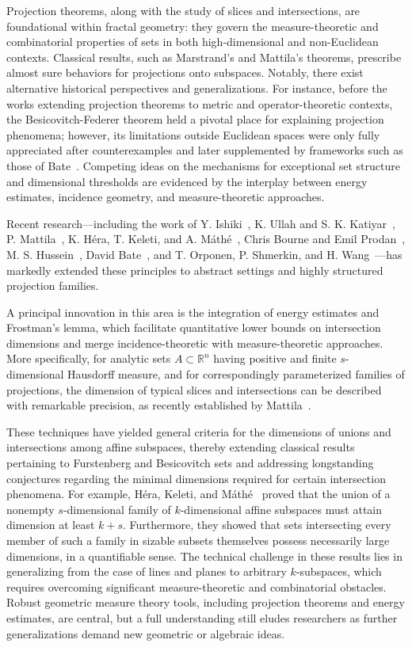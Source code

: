 \documentclass[sigconf]{acmart}
\begin{document}
Projection theorems, along with the study of slices and intersections, are foundational within fractal geometry: they govern the measure-theoretic and combinatorial properties of sets in both high-dimensional and non-Euclidean contexts. Classical results, such as Marstrand’s and Mattila’s theorems, prescribe almost sure behaviors for projections onto subspaces. Notably, there exist alternative historical perspectives and generalizations. For instance, before the works extending projection theorems to metric and operator-theoretic contexts, the Besicovitch-Federer theorem held a pivotal place for explaining projection phenomena; however, its limitations outside Euclidean spaces were only fully appreciated after counterexamples and later supplemented by frameworks such as those of Bate~\cite{ref43}. Competing ideas on the mechanisms for exceptional set structure and dimensional thresholds are evidenced by the interplay between energy estimates, incidence geometry, and measure-theoretic approaches.

Recent research—including the work of Y. Ishiki~\cite{ref1}, K. Ullah and S. K. Katiyar~\cite{ref6}, P. Mattila~\cite{ref74}, K. Héra, T. Keleti, and A. Máthé~\cite{ref75}, Chris Bourne and Emil Prodan~\cite{ref23}, M. S. Hussein~\cite{ref30}, David Bate~\cite{ref43}, and T. Orponen, P. Shmerkin, and H. Wang~\cite{ref92}—has markedly extended these principles to abstract settings and highly structured projection families.

A principal innovation in this area is the integration of energy estimates and Frostman's lemma, which facilitate quantitative lower bounds on intersection dimensions and merge incidence-theoretic with measure-theoretic approaches. More specifically, for analytic sets $A\subset\mathbb{R}^n$ having positive and finite $s$-dimensional Hausdorff measure, and for correspondingly parameterized families of projections, the dimension of typical slices and intersections can be described with remarkable precision, as recently established by Mattila~\cite{ref74}. 

These techniques have yielded general criteria for the dimensions of unions and intersections among affine subspaces, thereby extending classical results pertaining to Furstenberg and Besicovitch sets and addressing longstanding conjectures regarding the minimal dimensions required for certain intersection phenomena. For example, Héra, Keleti, and Máthé~\cite{ref75} proved that the union of a nonempty $s$-dimensional family of $k$-dimensional affine subspaces must attain dimension at least $k+s$. Furthermore, they showed that sets intersecting every member of such a family in sizable subsets themselves possess necessarily large dimensions, in a quantifiable sense. The technical challenge in these results lies in generalizing from the case of lines and planes to arbitrary $k$-subspaces, which requires overcoming significant measure-theoretic and combinatorial obstacles. Robust geometric measure theory tools, including projection theorems and energy estimates, are central, but a full understanding still eludes researchers as further generalizations demand new geometric or algebraic ideas.
\end{document}
